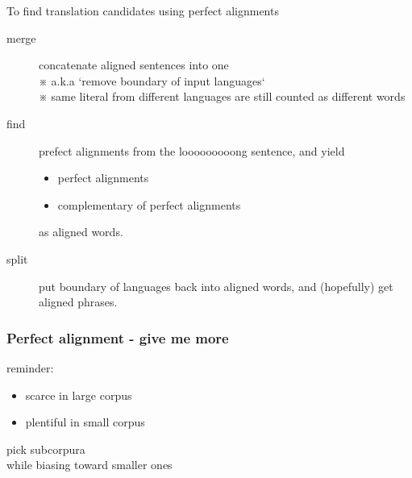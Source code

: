 {\begin{frame}
    To find translation candidates using perfect alignments
    \begin{description}
      \item[merge]
        concatenate aligned sentences into one \\
        { \small ※ a.k.a `remove boundary of input languages` } \\
        { \small ※ same literal from different languages are still counted as different words }
      \item[find] prefect alignments from the looooooooong sentence,
        and yield
        \begin{itemize}
          \item perfect alignments
          \item complementary of perfect alignments
        \end{itemize}
        as aligned words.
      \item[split]
        put boundary of languages back into aligned words,
        and (hopefully) get aligned phrases.
    \end{description}
  \end{frame}

  \begin{frame}
    \frametitle{Perfect alignment - give me more }
    reminder:
    \begin{itemize}
      \item scarce in {\Large large} corpus
      \item plentiful in {\small small} corpus
    \end{itemize}
    \vspace{1em}
    \inl{\Rightarrow} pick subcorpura
    \\ \hspace{2em} while biasing toward smaller ones
  \end{frame}

}

